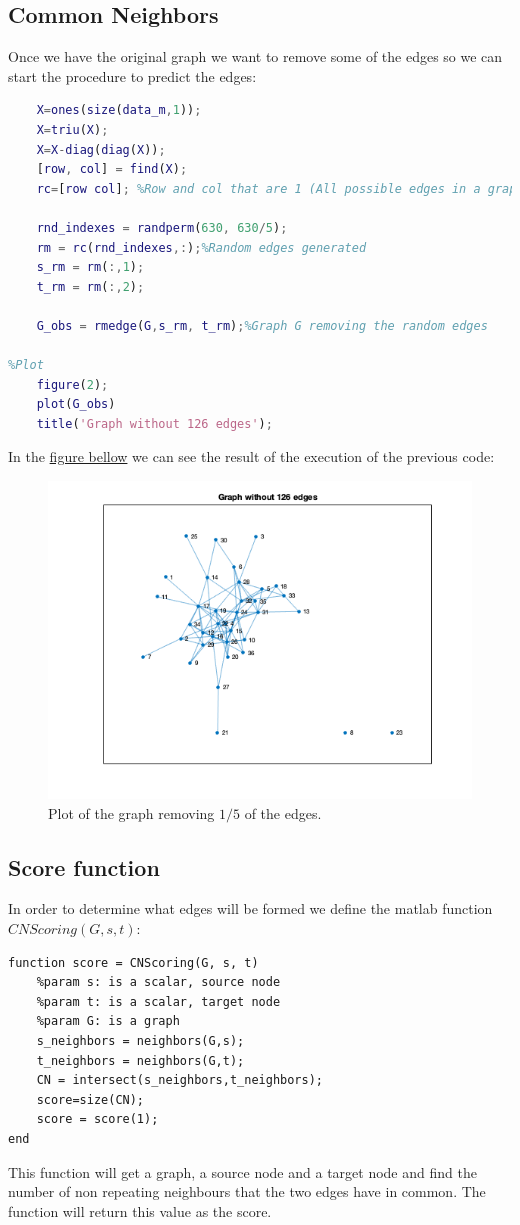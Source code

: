 \documentclass[12pt]{article}
\begin{document}
\subsection{Common Neighbors}
\justifying
Once we have the original graph we want to remove some of the edges so we can start the procedure to predict the edges:
\smallskip
\begin{lstlisting}[language=matlab]
%% Common Neighbors
    X=ones(size(data_m,1));
    X=triu(X);
    X=X-diag(diag(X));
    [row, col] = find(X);
    rc=[row col]; %Row and col that are 1 (All possible edges in a graph)

    rnd_indexes = randperm(630, 630/5);
    rm = rc(rnd_indexes,:);%Random edges generated
    s_rm = rm(:,1);
    t_rm = rm(:,2);

    G_obs = rmedge(G,s_rm, t_rm);%Graph G removing the random edges

%Plot
    figure(2);
    plot(G_obs)
    title('Graph without 126 edges');
\end{lstlisting}
In the \href{fig:croppedGraph}{figure bellow} we can see the result of the execution of the previous code:
\begin{figure}[H]
	\centering
	\includegraphics[width=13cm]{images/2.png}
	\caption{Plot of the graph removing $1/5$ of the edges.}
	\label{fig:croppedGraph}
\end{figure}

\subsection{Score function}
\justifying
In order to determine what edges will be formed we define the matlab function $CNScoring(G, s, t)$:
\label{code:CNScoring}
\begin{lstlisting}
function score = CNScoring(G, s, t)
    %param s: is a scalar, source node
    %param t: is a scalar, target node
    %param G: is a graph
    s_neighbors = neighbors(G,s);
    t_neighbors = neighbors(G,t);
    CN = intersect(s_neighbors,t_neighbors);
    score=size(CN);
    score = score(1);
end
\end{lstlisting}
\justifying
This function will get a graph, a source node and a target node and find the number of non repeating neighbours that the two edges have in common. The function will return this value as the score.
\end{document}
